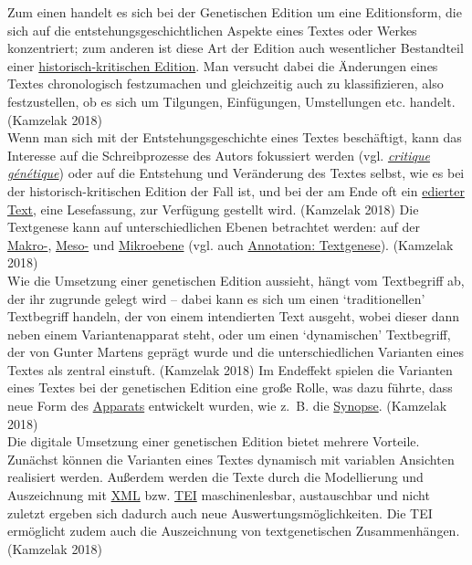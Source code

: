 \documentclass{article}
\begin{document}
    Zum einen handelt es sich bei der Genetischen Edition um eine Editionsform, die sich auf die entstehungsgeschichtlichen Aspekte eines Textes oder Werkes konzentriert; zum anderen ist diese Art der Edition auch wesentlicher Bestandteil einer \href{http://gams.uni-graz.at/o:konde.93}{historisch-kritischen Edition}. Man versucht dabei die Änderungen eines Textes chronologisch festzumachen und gleichzeitig auch zu klassifizieren, also festzustellen, ob es sich um Tilgungen, Einfügungen, Umstellungen etc. handelt. (Kamzelak 2018)\\
            
        Wenn man sich mit der Entstehungsgeschichte eines Textes beschäftigt, kann das Interesse auf die Schreibprozesse des Autors fokussiert werden (vgl. \emph{\href{http://gams.uni-graz.at/o:konde.46}{critique génétique}}) oder auf die Entstehung und Veränderung des Textes selbst, wie es bei der historisch-kritischen Edition der Fall ist, und bei der am Ende oft ein \href{http://gams.uni-graz.at/o:konde.75}{edierter Text}, eine Lesefassung, zur Verfügung gestellt wird. (Kamzelak 2018) Die Textgenese kann auf unterschiedlichen Ebenen betrachtet werden: auf der \href{http://gams.uni-graz.at/o:konde.23}{Makro-}, \href{http://gams.uni-graz.at/o:konde.24}{Meso-} und \href{http://gams.uni-graz.at/o:konde.26}{Mikroebene} (vgl. auch \href{http://gams.uni-graz.at/o:konde.28}{Annotation: Textgenese}). (Kamzelak 2018)\\
            
        Wie die Umsetzung einer genetischen Edition aussieht, hängt vom Textbegriff ab, der ihr zugrunde gelegt wird – dabei kann es sich um einen ‘traditionellen’ Textbegriff handeln, der von einem intendierten Text ausgeht, wobei dieser dann neben einem Variantenapparat steht, oder um einen ‘dynamischen’ Textbegriff, der von Gunter Martens geprägt wurde und die unterschiedlichen Varianten eines Textes als zentral einstuft. (Kamzelak 2018) Im Endeffekt spielen die Varianten eines Textes bei der genetischen Edition eine große Rolle, was dazu führte, dass neue Form des \href{http://gams.uni-graz.at/o:konde.32}{Apparats} entwickelt wurden, wie z. B. die \href{http://gams.uni-graz.at/o:konde.174}{Synopse}. (Kamzelak 2018)\\
            
        Die digitale Umsetzung einer genetischen Edition bietet mehrere Vorteile. Zunächst können die  Varianten eines Textes dynamisch mit variablen Ansichten realisiert werden. Außerdem werden die Texte durch die Modellierung und Auszeichnung mit \href{http://gams.uni-graz.at/o:konde.215}{XML} bzw. \href{http://gams.uni-graz.at/o:konde.178}{TEI} maschinenlesbar, austauschbar und nicht zuletzt ergeben sich dadurch auch neue Auswertungsmöglichkeiten. Die TEI ermöglicht zudem auch die Auszeichnung von textgenetischen Zusammenhängen. (Kamzelak 2018)\\
            
\end{document}

